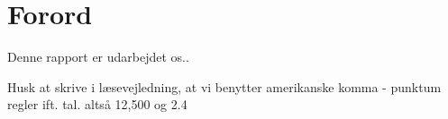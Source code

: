 \chapter*{Forord}
Denne rapport er udarbejdet os..

Husk at skrive i læsevejledning, at vi benytter amerikanske komma - punktum regler ift. tal. altså 12,500 og 2.4